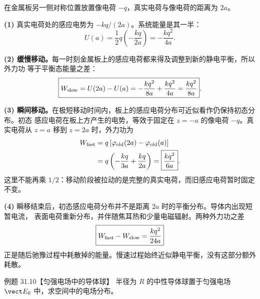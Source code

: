 \begin{xesolution}
在金属板另一侧对称位置放置像电荷 $-q$，真实电荷与像电荷的距离为 $2a$。

\textbf{(1)} 真实电荷处的感应电势为 $-kq/(2a)$。系统能量是其一半：
\begin{equation}
  \boxed{U(a)=\frac12q\left(-\frac{kq}{2a}\right)
  =-\frac{kq^2}{4a}}.
\end{equation}

\textbf{(2) 缓慢移动。}每一时刻金属板上的感应电荷都来得及调整到新的静电平衡，所以外力功
等于平衡态能量之差：
\begin{equation}
  \boxed{W_{\rm slow}=U(2a)-U(a)
  =-\frac{kq^2}{8a}+\frac{kq^2}{4a}
  =\frac{kq^2}{8a}}.
\end{equation}

\textbf{(3) 瞬间移动。}在极短移动时间内，板上的感应电荷分布可近似看作仍保持初态分布。初态
感应电荷在板上方产生的电势，等效于固定在 $z=-a$ 的像电荷 $-q$。真实电荷从 $z=a$ 移到
$z=2a$ 时，外力功为
\begin{align*}
  W_{\rm fast}
  &=q\left[\varphi_{\rm old}(2a)-\varphi_{\rm old}(a)\right]\\
  &=q\left(-\frac{kq}{3a}+\frac{kq}{2a}\right)
  =\boxed{\frac{kq^2}{6a}}.
\end{align*}
这里不能再乘 $1/2$：移动阶段被拉动的是完整的真实电荷，而旧感应电荷暂时固定不变。

\textbf{(4)} 瞬移结束后，初态感应电荷分布并不是距离 $2a$ 时的平衡分布。导体内出现短暂电流，
表面电荷重新分布，并伴随焦耳热和少量电磁辐射。两种外力功之差
\begin{equation}
  \boxed{W_{\rm fast}-W_{\rm slow}=\frac{kq^2}{24a}}
\end{equation}
正是随后驰豫过程中耗散掉的能量。慢速过程始终近似静电平衡，没有这部分额外耗散。

\groundPlaneEnergyDiagram
\end{xesolution}

\Needspace{0.4\textheight}
\begin{origexamplebox}{例题 31.10【匀强电场中的导体球】}
半径为 $R$ 的中性导体球置于匀强电场 $\vect E_0$ 中，求空间中的电场分布。
\end{origexamplebox}

